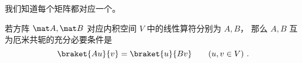 
\begin{issues}
\issueDraft
\end{issues}


我们知道每个矩阵都对应一个。

\begin{theorem}{}
若方阵 $\mat A, \mat B$ 对应内积空间 $V$ 中的线性算符分别为 $A, B$， 那么 $A, B$ 互为厄米共轭的充分必要条件是
\begin{equation}
\braket{Au}{v} = \braket{u}{B v} \qquad (u, v \in V)~.
\end{equation}
\end{theorem}


